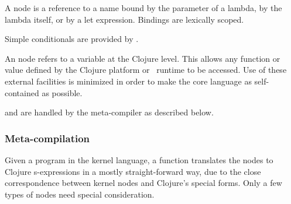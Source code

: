 A  node is a reference to a name bound by the parameter of a lambda, by the lambda itself, or by a let expression. Bindings are lexically scoped. 

Simple conditionals are provided by .


An  node refers to a variable at the Clojure level. This allows any function or value defined by the Clojure platform or \Meta\ runtime to be accessed. Use of these external facilities is minimized in order to make the core language as self-contained as possible. 

 and  are handled by the meta-compiler as described below.

\subsubsection{Meta-compilation}
Given a program in the kernel language, a function  translates the nodes to Clojure s-expressions in a mostly straight-forward way, due to the close correspondence between kernel nodes and Clojure's special forms. Only a few types of nodes need special consideration. %


